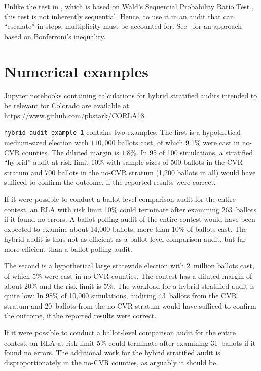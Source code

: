 \documentclass[runningheads]{llncs}
\begin{document}
Unlike the test in \cite{lindemanEtal12}, which is based on Wald's Sequential Probability Ratio Test \cite{wald45}, this test is not inherently sequential.
Hence, to use it in an audit that can ``escalate'' in steps, multiplicity must be accounted for. See~\cite{stark08a,stark09a} for an approach based on Bonferroni's inequality.


\section{Numerical examples}\label{sec:examples}

Jupyter notebooks containing calculations for hybrid stratified audits intended to be relevant for Colorado are available at \url{https://www.github.com/pbstark/CORLA18}.

\texttt{hybrid-audit-example-1} contains two examples. 
The first is a hypothetical medium-sized election with 
$110,000$ ballots cast, of which 
9.1\% were cast in no-CVR counties. 
The diluted margin is $1.8\%$.
In 95 of 100 simulations, a stratified ``hybrid'' audit at risk limit 10\% with sample sizes of 500 ballots 
in the CVR stratum and 700 ballots in the no-CVR stratum
(1,200 ballots in all)
would have sufficed to confirm the outcome, if the reported results were correct.

If it were possible to conduct a ballot-level comparison audit for the entire contest, 
an RLA with risk limit 10\% could terminate after examining 263~ballots if it found no errors.
A ballot-polling audit of the entire contest would have been expected to examine about 14,000 ballots, more than 10\% of ballots cast.
The hybrid audit is thus not as efficient as a ballot-level comparison audit, but far more efficient than a ballot-polling audit.

The second is a hypothetical large statewide election with 
2~million ballots cast, of which 5\% were cast in no-CVR counties.
The contest has a diluted margin of about $20\%$ and the risk limit is 5\%.
The workload for a hybrid stratified audit is quite low:
In 98\% of 10,000 simulations, auditing 43~ballots from the 
CVR stratum and 20~ballots from the no-CVR stratum
would have sufficed to confirm the outcome, if the reported results were correct.

If it were possible to conduct a ballot-level comparison audit for the entire contest, 
an RLA at risk limit 5\% could terminate after examining 31~ballots if it found no errors.
The additional work for the hybrid stratified audit is disproportionately in the no-CVR counties, as
arguably it should be.
\end{document}
